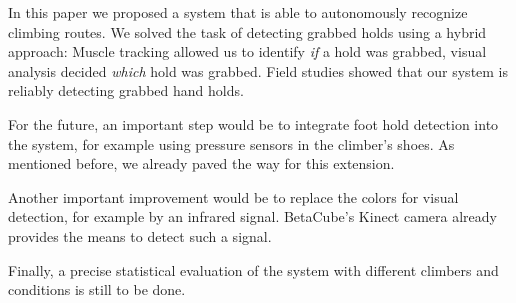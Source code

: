 In this paper we proposed a system that is able to autonomously recognize climbing routes.
We solved the task of detecting grabbed holds using a hybrid approach:
Muscle tracking allowed us to identify \emph{if} a hold was grabbed, visual analysis decided \emph{which} hold was grabbed.
Field studies showed that our system is reliably detecting grabbed hand holds.

For the future, an important step would be to integrate foot hold detection into the system, for example using pressure sensors in the climber's shoes.
As mentioned before, we already paved the way for this extension.

Another important improvement would be to replace the colors for visual detection, for example by an infrared signal.
BetaCube's Kinect camera already provides the means to detect such a signal.

Finally, a precise statistical evaluation of the system with different climbers and conditions is still to be done.